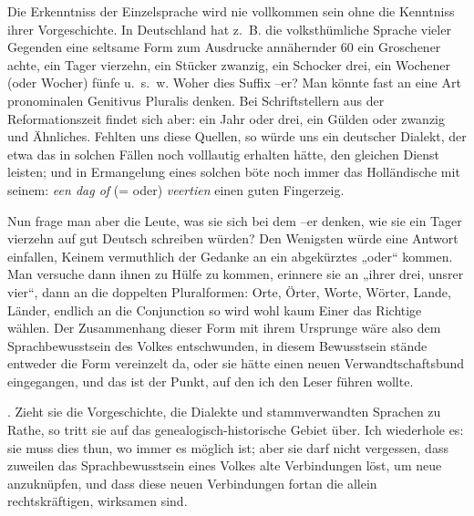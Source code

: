 Die Erkenntniss der Einzelsprache wird nie vollkommen sein ohne die Kenntniss ihrer Vorgeschichte. In Deutschland hat z.~B. die volksthümliche Sprache vieler Gegenden eine seltsame Form zum Ausdrucke annähernder 60{\textbar}{\textbar}\label{sp.60} ein Groschener achte, ein Tager vierzehn, ein Stücker zwanzig, ein Schocker drei, ein Wochener (oder Wocher) fünfe u.~s.~w. Woher dies Suffix –er? Man könnte fast an eine Art pronominalen Genitivus Pluralis denken. Bei Schriftstellern aus der Reformationszeit findet sich aber: ein Jahr oder drei, ein Gülden oder zwanzig und Ähnliches. Fehlten uns diese Quellen, so würde uns ein deutscher Dialekt, der etwa das  in solchen Fällen noch volllautig erhalten hätte, den gleichen Dienst leisten; und in Ermangelung eines solchen böte noch immer das Holländische mit seinem: \textit{een dag of} (= oder) \textit{veertien} einen guten Fingerzeig.

Nun frage man aber die Leute, was sie sich bei dem –er denken, wie sie ein Tager vierzehn auf gut Deutsch schreiben würden? Den Wenigsten würde eine Antwort einfallen, Keinem vermuthlich der Gedanke an ein abgekürztes „oder“ kommen. Man versuche dann ihnen zu Hülfe zu kommen, erinnere sie an „ihrer drei, unsrer vier“, dann an die doppelten Pluralformen: Orte, Örter, Worte, Wörter, Lande, Länder, endlich an die Conjunction  so wird wohl kaum Einer das Richtige wählen. Der Zusammenhang dieser Form mit ihrem Ursprunge wäre also dem Sprachbewusstsein des Volkes entschwunden, in diesem Bewusstsein stände entweder die Form vereinzelt da, oder sie hätte einen neuen Verwandtschaftsbund eingegangen, und das ist der Punkt, auf den ich den Leser führen wollte.

. Zieht sie die Vorgeschichte, die Dialekte und stammverwandten Sprachen zu Rathe, so tritt sie auf das genealogisch-historische Gebiet über. Ich wiederhole es: sie muss dies thun, wo immer es möglich ist; aber sie darf nicht vergessen, dass zuweilen \label{fp.61} das Sprachbewusstsein eines Volkes alte Verbindungen löst, um neue anzuknüpfen, und dass diese neuen Verbindungen fortan die allein rechtskräftigen, wirksamen sind.


